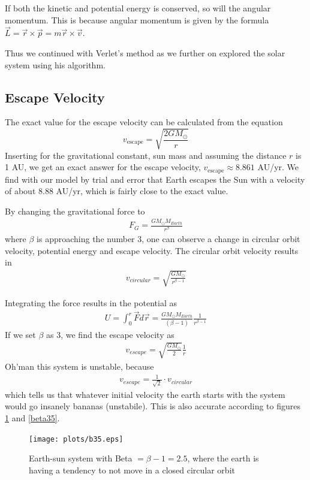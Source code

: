 \documentclass{article}
\begin{document}
If both the kinetic and potential energy is conserved, so will the angular momentum. This is because angular momentum is given by the formula $\vec{L}=\vec{r} \times \vec{p} =m \vec{r} \times \vec{v}$.


Thus we continued with Verlet's method as we further on explored the solar system using his algorithm.

\subsection{Escape Velocity}
The exact value for the escape velocity can be calculated from the equation
$$v_{\mathrm{escape}}=\sqrt{\frac{2GM_{\odot}}{r}}$$
Inserting for the gravitational constant, sun mass and assuming the distance $r$ is 1 AU, we get an exact answer for the escape velocity, $v_{\mathrm{escape}}\approx 8.861$ AU/yr. We find with our model by trial and error that Earth escapes the Sun with a velocity of about $8.88$ AU/yr, which is fairly close to the exact value.

By changing the gravitational force to
\begin{align*}
  F_G = \frac{GM_{\odot}M_{Earth}}{r^{\beta}}
\end{align*}
where $\beta$ is approaching the number $3$, one can observe a change in circular orbit velocity, potential energy and escape velocity. The circular orbit velocity results in
\begin{align*}
  v_{circular}=\sqrt{\frac{GM_{\odot}}{r^{\beta-1}}}
\end{align*}

Integrating the force results in the potential as
\begin{align*}
  U = \int_0^r \vec{F} d\vec{r} =  \frac{GM_{\odot}M_{Earth}}{(\beta-1)} \frac{1}{r^{\beta-1}}
\end{align*}
If we set $\beta$ as $3$, we find the escape velocity as
\begin{align*}
  v_{escape} = \sqrt{\frac{GM_{\odot}}{2}} \frac{1}{r}
\end{align*}
Oh'man this system is unstable, because
\begin{align*}
  v_{escape} = \frac{1}{\sqrt{2}}\cdot v_{circular}
\end{align*}
which tells us that whatever initial velocity the earth starts with the system would go insanely bananas (unstabile). This is also accurate according to figures \ref{beta25} and \ref{beta35}.

\begin{figure}[H]
  \texttt{[image: plots/b35.eps]}
  \caption{Earth-sun system with Beta $= \beta - 1 = 2.5$, where the earth is having a tendency to not move in a closed circular orbit}
  \label{beta25}
\end{figure}
\end{document}
